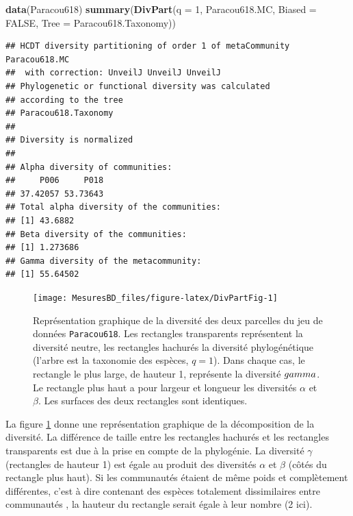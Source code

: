\documentclass[
  11pt,
  french,
  a4paper,
  extrafontsizes,onecolumn,openright
  ]{memoir}
\newenvironment{Shaded}{\begin{snugshade}}{\end{snugshade}}
\newcommand{\DataTypeTok}[1]{\textcolor[rgb]{0.13,0.29,0.53}{#1}}
\newcommand{\DecValTok}[1]{\textcolor[rgb]{0.00,0.00,0.81}{#1}}
\newcommand{\KeywordTok}[1]{\textcolor[rgb]{0.13,0.29,0.53}{\textbf{#1}}}
\newcommand{\NormalTok}[1]{#1}
\newcommand{\OtherTok}[1]{\textcolor[rgb]{0.56,0.35,0.01}{#1}}
\newlength{\rf}
\begin{document}
\scriptsize

\begin{Shaded}
\begin{Highlighting}[]
\KeywordTok{data}\NormalTok{(Paracou618)}
\KeywordTok{summary}\NormalTok{(}\KeywordTok{DivPart}\NormalTok{(}\DataTypeTok{q =} \DecValTok{1}\NormalTok{, Paracou618.MC, }\DataTypeTok{Biased =} \OtherTok{FALSE}\NormalTok{,}
                \DataTypeTok{Tree =}\NormalTok{ Paracou618.Taxonomy))}
\end{Highlighting}
\end{Shaded}

\begin{verbatim}
## HCDT diversity partitioning of order 1 of metaCommunity Paracou618.MC
##  with correction: UnveilJ UnveilJ UnveilJ
## Phylogenetic or functional diversity was calculated
## according to the tree 
## Paracou618.Taxonomy 
## 
## Diversity is normalized 
## 
## Alpha diversity of communities: 
##     P006     P018 
## 37.42057 53.73643 
## Total alpha diversity of the communities: 
## [1] 43.6882
## Beta diversity of the communities: 
## [1] 1.273686
## Gamma diversity of the metacommunity: 
## [1] 55.64502
\end{verbatim}

\normalsize



\scriptsize

\begin{figure}

{\centering \texttt{[image: MesuresBD\_files/figure-latex/DivPartFig-1]} 

}

\caption{Représentation graphique de la diversité des deux parcelles du jeu de données \texttt{Paracou618}. Les rectangles transparents représentent la diversité neutre, les rectangles hachurés la diversité phylogénétique (l'arbre est la taxonomie des espèces, \(q=1\)). Dans chaque cas, le rectangle le plus large, de hauteur 1, représente la diversité \(\\gamma\). Le rectangle plus haut a pour largeur et longueur les diversités \(\alpha\) et \(\beta\). Les surfaces des deux rectangles sont identiques.}\label{fig:DivPartFig}
\end{figure}

\normalsize

La figure \ref{fig:DivPartFig} donne une représentation graphique de la décomposition de la diversité.
La différence de taille entre les rectangles hachurés et les rectangles transparents est due à la prise en compte de la phylogénie.
La diversité \(\gamma\) (rectangles de hauteur 1) est égale au produit des diversités \(\alpha\) et \(\beta\) (côtés du rectangle plus haut).
Si les communautés étaient de même poids et complètement différentes, c'est à dire contenant des espèces totalement dissimilaires entre communautés \autocite{Pavoine2015a}, la hauteur du rectangle serait égale à leur nombre (2 ici).
\end{document}
